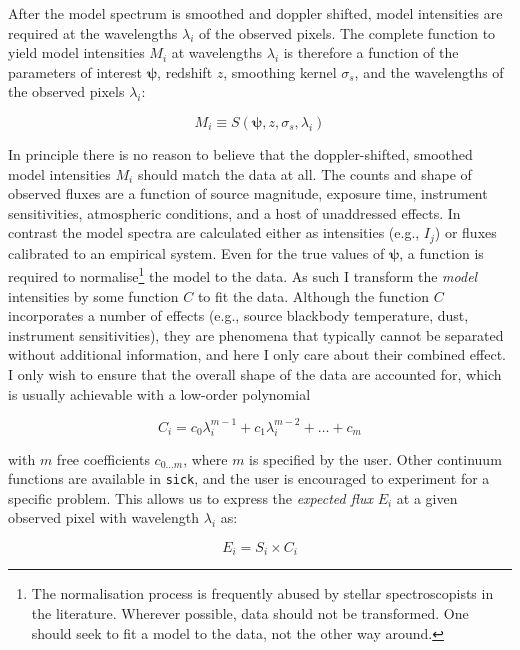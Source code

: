\documentclass[iop]{emulateapj}
\newcommand{\sick}{\texttt{sick}}
\begin{document}
After the model spectrum is smoothed and doppler shifted, model intensities are 
required at the wavelengths $\lambda_i$ of the observed pixels. The complete 
function to yield model intensities $M_i$ at wavelengths $\lambda_i$ is therefore 
a function of the parameters of interest $\bm{\psi}$, redshift $z$, smoothing 
kernel $\sigma_{s}$, and the wavelengths of the observed pixels $\lambda_i$:

\begin{equation}
 M_{i} \equiv S\left(\bm{\psi},z,\sigma_{s},\lambda_i\right)
\end{equation}

In principle there is no reason to believe that the doppler-shifted, smoothed 
model intensities $M_i$ should match the data at all. The counts and shape of 
observed fluxes are a function of source magnitude, exposure time, instrument 
sensitivities, atmospheric conditions, and a host of unaddressed effects. In 
contrast the model spectra are calculated either as intensities (e.g., $I_j$) 
or fluxes calibrated to an empirical system. Even for the true values of 
$\bm{\psi}$, a function is required to normalise\footnote{The normalisation 
process is frequently abused by stellar spectroscopists in the literature. 
Wherever possible, data should not be transformed. One should seek to fit a 
model to the data, not the other way around.} the model to the data. As such I 
transform the \textit{model} intensities by some function $C$ to fit the data. 
Although the function $C$ incorporates a number of effects (e.g., source 
blackbody temperature, dust, instrument sensitivities), they are phenomena that 
typically cannot be separated without additional information, and here I only 
care about their combined effect. I only wish to ensure that the overall shape 
of the data are accounted for, which is usually achievable with a low-order 
polynomial

\begin{equation}
C_i = c_{0}\lambda_{i}^{m-1} + c_{1}\lambda_{i}^{m-2} + \dots + c_{m}
\end{equation}

\noindent{}with $m$ free coefficients $c_{0\dots{}m}$, where $m$ is specified by 
the user. Other continuum functions are available in \sick{}, and the user is 
encouraged to experiment for a specific problem. This allows us to express the 
\textit{expected flux} $E_i$ at a given observed pixel with wavelength $\lambda_i$ as:

\begin{equation}
E_i = S_{i}\times{}C_i
\end{equation}
\end{document}
